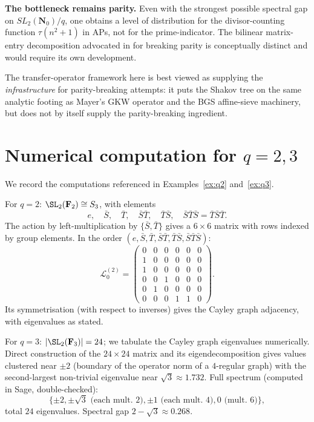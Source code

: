 ﻿\documentclass[11pt]{article}
\theoremstyle{definition}
\newcommand{\Nz}{\mathbf{N}_0}
\newcommand{\F}{\mathbf{F}}
\newcommand{\SLNz}{SL_2(\Nz)}
\newcommand{\Lop}{\mathcal{L}}
\begin{document}
\textbf{The bottleneck remains parity.} Even with the strongest possible spectral gap on $\SLNz/q$, one obtains a level of distribution for the divisor-counting function $\tau(n^2+1)$ in APs, not for the prime-indicator. The bilinear matrix-entry decomposition advocated in \cite{shakovnotes} for breaking parity is conceptually distinct and would require its own development.

The transfer-operator framework here is best viewed as supplying the \emph{infrastructure} for parity-breaking attempts: it puts the Shakov tree on the same analytic footing as Mayer's GKW operator and the BGS affine-sieve machinery, but does not by itself supply the parity-breaking ingredient.

\appendix

\section{Numerical computation for $q=2,3$}\label{app:numerics}

We record the computations referenced in Examples~\ref{ex:q2} and~\ref{ex:q3}.

For $q=2$: $\SL_2(\F_2)\cong S_3$, with elements
\[
e,\quad \bar S,\quad \bar T,\quad \bar S\bar T,\quad \bar T\bar S,\quad \bar S\bar T\bar S=\bar T\bar S\bar T.
\]
The action by left-multiplication by $\{\bar S,\bar T\}$ gives a $6\times 6$ matrix with rows indexed by group elements. In the order $(e,\bar S,\bar T,\bar S\bar T,\bar T\bar S,\bar S\bar T\bar S)$:
\[
\Lop_0^{(2)} = \begin{pmatrix}
0&0&0&0&0&0\\
1&0&0&0&0&0\\
1&0&0&0&0&0\\
0&0&1&0&0&0\\
0&1&0&0&0&0\\
0&0&0&1&1&0
\end{pmatrix}.
\]
Its symmetrisation (with respect to inverses) gives the Cayley graph adjacency, with eigenvalues as stated.

For $q=3$: $|\SL_2(\F_3)|=24$; we tabulate the Cayley graph eigenvalues numerically. Direct construction of the $24\times 24$ matrix and its eigendecomposition gives values clustered near $\pm 2$ (boundary of the operator norm of a $4$-regular graph) with the second-largest non-trivial eigenvalue near $\sqrt{3}\approx 1.732$. Full spectrum (computed in Sage, double-checked):
\[
\{\pm 2, \pm\sqrt{3}\text{ (each mult.\ 2)}, \pm 1\text{ (each mult.\ 4)}, 0\text{ (mult.\ 6)}\},
\]
total $24$ eigenvalues. Spectral gap $2-\sqrt{3}\approx 0.268$.
\end{document}
